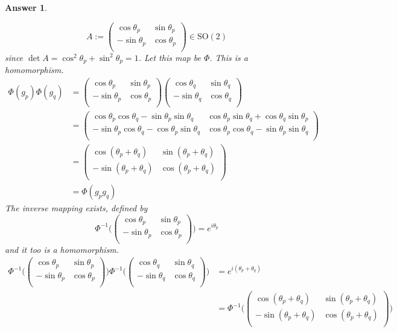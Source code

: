 \documentclass[a4paper]{article}
\newtheorem{ans}{Answer}[section]
\theoremstyle{new}
\begin{document}
\begin{ans}
\begin{enumerate}[label=(\roman*)]
$$A:=\begin{pmatrix}\cos\theta_p&\sin\theta_p\\-\sin\theta_p&\cos\theta_p\\\end{pmatrix}\in\text{SO}(2)$$
since $\det A=\cos^2\theta_p+\sin^2\theta_p=1$. Let this map be $\Phi$. This is a homomorphism.
\begin{align}
    \Phi(g_p)\Phi(g_q)&=\begin{pmatrix}\cos\theta_p&\sin\theta_p\\-\sin\theta_p&\cos\theta_p\\\end{pmatrix}\begin{pmatrix}\cos\theta_q&\sin\theta_q\\-\sin\theta_q&\cos\theta_q\\\end{pmatrix}\nonumber\\&=\begin{pmatrix}\cos\theta_p\cos\theta_q-\sin\theta_p\sin\theta_q&\cos\theta_p\sin\theta_q+\cos\theta_q\sin\theta_p\\-\sin\theta_p\cos\theta_q-\cos\theta_p\sin\theta_q&\cos\theta_p\cos\theta_q-\sin\theta_p\sin\theta_q\\\end{pmatrix}\nonumber\\&=\begin{pmatrix}\cos(\theta_p+\theta_q)&\sin(\theta_p+\theta_q)\\-\sin(\theta_p+\theta_q)&\cos(\theta_p+\theta_q)\\\end{pmatrix}\nonumber\\&=\Phi(g_pg_q)\nonumber
\end{align}
The inverse mapping exists, defined by
$$\Phi^{-1}\bigg(\begin{pmatrix}\cos\theta_p&\sin\theta_p\\-\sin\theta_p&\cos\theta_p\\\end{pmatrix}\bigg)=e^{i\theta_p}$$
and it too is a homomorphism.
\begin{align}
    \Phi^{-1}\bigg(\begin{pmatrix}\cos\theta_p&\sin\theta_p\\-\sin\theta_p&\cos\theta_p\\\end{pmatrix}\bigg)\Phi^{-1}\bigg(\begin{pmatrix}\cos\theta_q&\sin\theta_q\\-\sin\theta_q&\cos\theta_q\\\end{pmatrix}\bigg)&=e^{i(\theta_p+\theta_q)}\nonumber\\&=\Phi^{-1}\bigg(\begin{pmatrix}\cos(\theta_p+\theta_q)&\sin(\theta_p+\theta_q)\\-\sin(\theta_p+\theta_q)&\cos(\theta_p+\theta_q)\\\end{pmatrix}\bigg)\nonumber

\end{align}
\end{enumerate}
\end{ans}
\end{document}
